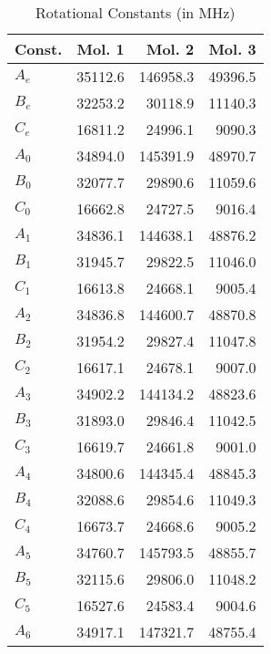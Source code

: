 \begin{table}
\centering
\caption{Rotational Constants (in MHz)}
\begin{tabular}{lrrr}
Const. &          Mol. 1 &          Mol. 2 &          Mol. 3 \\
\hline
$A_{e    }$ &         35112.6 &        146958.3 &         49396.5 \\
$B_{e    }$ &         32253.2 &         30118.9 &         11140.3 \\
$C_{e    }$ &         16811.2 &         24996.1 &          9090.3 \\
$A_{0    }$ &         34894.0 &        145391.9 &         48970.7 \\
$B_{0    }$ &         32077.7 &         29890.6 &         11059.6 \\
$C_{0    }$ &         16662.8 &         24727.5 &          9016.4 \\
$A_{1    }$ &         34836.1 &        144638.1 &         48876.2 \\
$B_{1    }$ &         31945.7 &         29822.5 &         11046.0 \\
$C_{1    }$ &         16613.8 &         24668.1 &          9005.4 \\
$A_{2    }$ &         34836.8 &        144600.7 &         48870.8 \\
$B_{2    }$ &         31954.2 &         29827.4 &         11047.8 \\
$C_{2    }$ &         16617.1 &         24678.1 &          9007.0 \\
$A_{3    }$ &         34902.2 &        144134.2 &         48823.6 \\
$B_{3    }$ &         31893.0 &         29846.4 &         11042.5 \\
$C_{3    }$ &         16619.7 &         24661.8 &          9001.0 \\
$A_{4    }$ &         34800.6 &        144345.4 &         48845.3 \\
$B_{4    }$ &         32088.6 &         29854.6 &         11049.3 \\
$C_{4    }$ &         16673.7 &         24668.6 &          9005.2 \\
$A_{5    }$ &         34760.7 &        145793.5 &         48855.7 \\
$B_{5    }$ &         32115.6 &         29806.0 &         11048.2 \\
$C_{5    }$ &         16527.6 &         24583.4 &          9004.6 \\
$A_{6    }$ &         34917.1 &        147321.7 &         48755.4 \\

\end{tabular}
\end{table}
